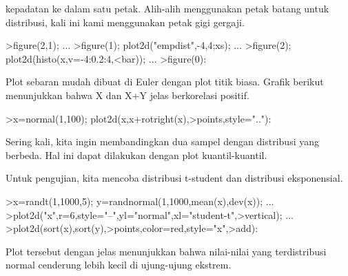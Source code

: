 \documentclass[a4paper,10pt]{article}
\begin{document}
\begin{eulernotebook}
\begin{eulercomment}
\begin{eulercomment}
\begin{eulercomment}
\begin{eulercomment}
\begin{eulercomment}
\begin{eulercomment}
\begin{eulercomment}
\begin{eulercomment}
\begin{eulercomment}
\begin{eulercomment}
\begin{eulercomment}
\begin{eulercomment}
\begin{eulercomment}
\begin{eulercomment}
\begin{eulercomment}
\begin{eulercomment}
\begin{eulercomment}
\begin{eulercomment}
\begin{eulercomment}
\begin{eulercomment}
\begin{eulercomment}
\begin{eulercomment}
\begin{eulercomment}
\begin{eulercomment}
\begin{eulercomment}
\begin{eulercomment}
\begin{eulercomment}
\begin{eulercomment}
\begin{eulercomment}
\begin{eulercomment}
\begin{eulercomment}
\begin{eulercomment}
\begin{eulercomment}
kepadatan ke dalam satu petak. Alih-alih menggunakan petak batang
untuk distribusi, kali ini kami menggunakan petak gigi gergaji.
\end{eulercomment}
\begin{eulerprompt}
>figure(2,1); ...
>figure(1); plot2d("empdist",-4,4;xs); ...
>figure(2); plot2d(histo(x,v=-4:0.2:4,<bar));  ...
>figure(0):
\end{eulerprompt}
\begin{eulercomment}
Plot sebaran mudah dibuat di Euler dengan plot titik biasa. Grafik
berikut menunjukkan bahwa X dan X+Y jelas berkorelasi positif.
\end{eulercomment}
\begin{eulerprompt}
>x=normal(1,100); plot2d(x,x+rotright(x),>points,style=".."):
\end{eulerprompt}
\begin{eulercomment}
Sering kali, kita ingin membandingkan dua sampel dengan distribusi
yang berbeda. Hal ini dapat dilakukan dengan plot kuantil-kuantil.

Untuk pengujian, kita mencoba distribusi t-student dan distribusi
eksponensial.
\end{eulercomment}
\begin{eulerprompt}
>x=randt(1,1000,5); y=randnormal(1,1000,mean(x),dev(x)); ...
>plot2d("x",r=6,style="--",yl="normal",xl="student-t",>vertical); ...
>plot2d(sort(x),sort(y),>points,color=red,style="x",>add):
\end{eulerprompt}
\begin{eulercomment}
Plot tersebut dengan jelas menunjukkan bahwa nilai-nilai yang
terdistribusi normal cenderung lebih kecil di ujung-ujung ekstrem.


\end{eulercomment}
\end{eulercomment}
\end{eulercomment}
\end{eulercomment}
\end{eulercomment}
\end{eulercomment}
\end{eulercomment}
\end{eulercomment}
\end{eulercomment}
\end{eulercomment}
\end{eulercomment}
\end{eulercomment}
\end{eulercomment}
\end{eulercomment}
\end{eulercomment}
\end{eulercomment}
\end{eulercomment}
\end{eulercomment}
\end{eulercomment}
\end{eulercomment}
\end{eulercomment}
\end{eulercomment}
\end{eulercomment}
\end{eulercomment}
\end{eulercomment}
\end{eulercomment}
\end{eulercomment}
\end{eulercomment}
\end{eulercomment}
\end{eulercomment}
\end{eulercomment}
\end{eulercomment}
\end{eulercomment}
\end{eulernotebook}
\end{document}
